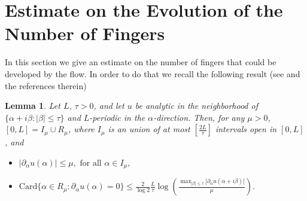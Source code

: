 \documentclass[11pt]{article}
\numberwithin{equation}{section}
\newtheorem{lem}[thm]{Lemma}
\begin{document}
\section{Estimate on the Evolution of the Number of Fingers}\label{sec:relaxation}
In this section we  give an estimate on the number of fingers that could be developed by the flow. In order to do that we recall the following result (see \cite{grujic2000spatial} and the references therein)
\begin{lem}\label{grujic}
Let $L$, $\tau>0$, and let $u$ be analytic in the neighborhood of $\{\alpha+i\beta: |\beta|\leq \tau\}$ and $L$-periodic in the $\alpha$-direction. Then, for any $\mu>0$, $[0, L]=I_\mu\cup R_\mu$, where $I_\mu$ is an union of at most $[\frac{2L}{\tau}]$ intervals open in $[0, L]$, and
\begin{itemize}
\item $|\partial_\alpha u(\alpha)| \leq \mu, \text{ for all }\alpha\in I_\mu,$
\item $\text{Card}\{\alpha \in R_\mu : \partial_\alpha u(\alpha)=0\}\leq
\frac{2}{\log 2}\frac{L}{\tau}\log\left(\frac{\max_{|\beta|\leq \tau}|\partial_\alpha u(\alpha+i\beta)|}{\mu}\right).$
\end{itemize}
\end{lem}
\end{document}
